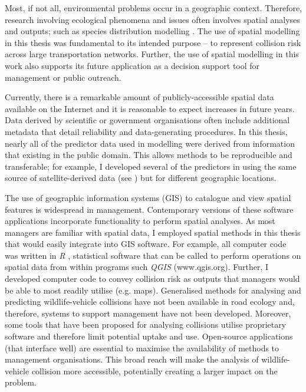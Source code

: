 Most, if not all, environmental problems occur in a geographic context. Therefore, research involving ecological phenomena and issues often involves spatial analyses and outputs; such as species distribution modelling \citep[e.g.][]{elit09}. The use of spatial modelling in this thesis was fundamental to its intended purpose -- to represent collision risk across large transportation networks. Further, the use of spatial modelling in this work also supports its future application as a decision support tool for management or public outreach.


Currently, there is a remarkable amount of publicly-accessible spatial data available on the Internet \citep{ma15} and it is reasonable to expect increases in future years. Data derived by scientific or government organisations often include additional metadata that detail reliability and data-generating procedures. In this thesis, nearly all of the predictor data used in modelling were derived from information that existing in the public domain. This allows methods to be reproducible and transferable; for example, I developed several of the predictors in  using the same source of satellite-derived data (see ) but for different geographic locations.


The use of geographic information systems (GIS) to catalogue and view spatial features is widespread in management. Contemporary versions of these software applications incorporate functionality to perform spatial analyses. As most managers are familiar with spatial data, I employed spatial methods in this thesis that would easily integrate into GIS software. For example, all computer code was written in \textit{R} \citep{rdct16}, statistical software that can be called to perform operations on spatial data from within programs such \textit{QGIS} (www.qgis.org). Further, I developed computer code to convey collision risk as outputs that managers would be able to most readily utilise (e.g. maps). Generalised methods for analysing and predicting wildlife-vehicle collisions have not been available in road ecology and, therefore, systems to support management have not been developed. Moreover, some tools that have been proposed for analysing collisions utilise proprietary software and therefore limit potential uptake and use. Open-source applications (that interface well) are essential to maximise the availability of methods to management organisations. This broad reach will make the analysis of wildlife-vehicle collision more accessible, potentially creating a larger impact on the problem.

